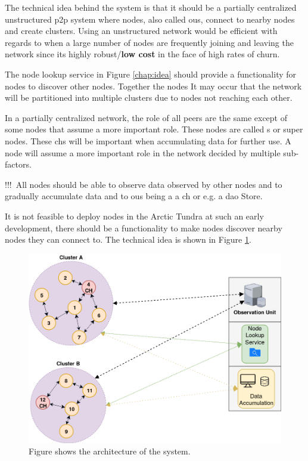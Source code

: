 \documentclass[USenglish]{uit-thesis}
\begin{document}

The technical idea behind the system is that it should be a partially centralized unstructured \gls{p2p} system where nodes, also called \gls{ou}s, connect to nearby nodes and create clusters. Using an unstructured network would be efficient with regards to  when a large number of nodes are frequently joining and leaving the network since its highly robust/\textbf{low cost} in the face of high rates of churn.

The node lookup service in Figure \ref{chap:idea} should provide a functionality for nodes to discover other nodes. Together the nodes It may occur that the network will be partitioned into multiple clusters due to nodes not reaching each other.


In a partially centralized network, the role of all peers are the same except of some nodes that assume a more important role. These nodes are called s or super nodes. These \gls{ch}s will be important when accumulating data for further use. A node will assume a more important role in the network decided by multiple sub-factors. 

!!!\
All nodes should be able to observe data observed by other nodes and to gradually accumulate data and to \gls{ou}s being a a \gls{ch} or e.g. a \gls{dao} Store.

It is not feasible to deploy nodes in the Arctic Tundra at such an early development, there should be a functionality to make nodes discover nearby nodes they can connect to. 
The technical idea is shown in Figure \ref{fig:idea}. 

\begin{figure}
\centering
\includegraphics[width=\textwidth]{idea.png}
\caption{Figure shows the architecture of the system.}
\label{fig:idea}
\end{figure}
\end{document}
